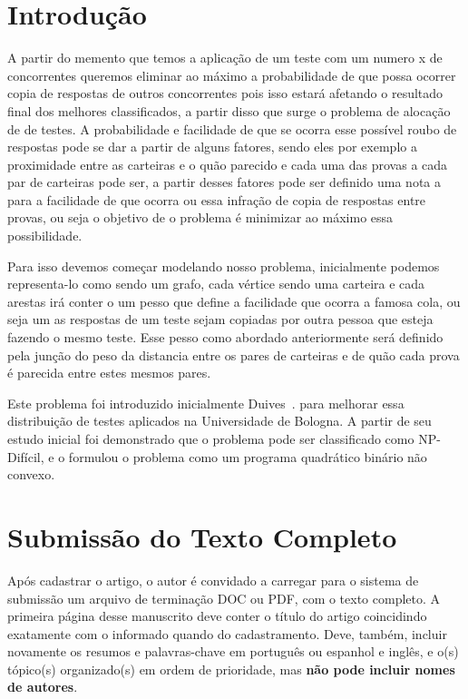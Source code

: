 \documentclass[a4paper,11pt]{article}
\begin{document}
 
\newpage
\section{Introdu\c{c}\~ao} 
 
A partir do memento que temos a aplica\c c\~ao de um teste com um numero x de concorrentes queremos eliminar ao m\'aximo a probabilidade de que possa ocorrer copia de respostas de outros concorrentes 
pois isso estar\'a afetando o resultado final dos melhores classificados, a partir disso que surge o problema de aloca\c c\~ao de de testes. 
A probabilidade e facilidade de que se ocorra esse poss\'ivel roubo de respostas pode se dar a partir de alguns fatores,
sendo eles por exemplo a proximidade entre as carteiras e o qu\~ao parecido e cada uma das provas a cada par de carteiras pode ser, a partir desses fatores pode ser 
definido uma nota a para a facilidade de que ocorra ou essa infra\c c\~ao de copia de respostas entre provas, ou seja o objetivo de o problema \'e minimizar ao m\'aximo
essa possibilidade. 

Para isso devemos come\c car modelando nosso problema, inicialmente podemos representa-lo como sendo um grafo, cada v\'ertice sendo uma carteira e cada arestas ir\'a conter
o um pesso que define a facilidade que ocorra a famosa cola, ou seja um as respostas de um teste sejam copiadas por outra pessoa que esteja fazendo o mesmo teste. Esse pesso como
abordado anteriormente ser\'a definido pela jun\c c\~ao do peso da distancia entre os pares de carteiras e de qu\~ao cada prova \'e parecida entre estes mesmos pares.

Este problema foi introduzido inicialmente Duives~\citep{duives:13}. para melhorar essa distribui\c c\~ao de testes aplicados na Universidade de Bologna. A partir de seu estudo inicial foi demonstrado que o 
problema pode ser classificado como NP-Dif\'icil, e o formulou o problema como um programa quadr\'atico bin\'ario n\~ao convexo.

\section{Submiss\~ao do Texto Completo}

Ap\'os cadastrar o artigo, o autor \'e convidado a carregar para o sistema de submiss\~ao um arquivo 
de termina\-\c c\~ao DOC ou PDF, com o texto completo. 
A primeira p\'agina desse manuscrito deve conter o t\'itulo do artigo coincidindo exatamente com o informado quando do cadastramento. 
Deve, tamb\'em, incluir novamente os resumos e palavras-chave em portugu\^es ou espanhol e ingl\^es, e o(s) t\'opico(s) organizado(s) 
em ordem de prioridade, mas \textbf{n\~ao pode incluir nomes de autores}.
\end{document}
